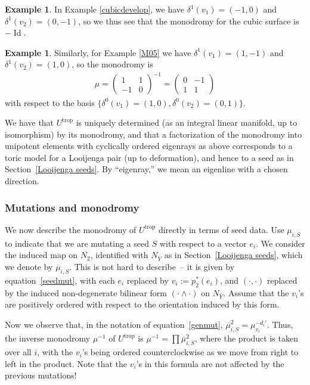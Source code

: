 \documentclass[pdftex]{sigma}
\numberwithin{equation}{section}
\numberwithin{figure}{section}
\numberwithin{table}{section}
\DeclareMathOperator{\id}{Id}
\DeclareMathOperator{\trop}{trop}
\let\?=\overline
\theoremstyle{definition}
\newtheorem{eg}[thm]{Example}
\begin{document}
\begin{eg}In Example \ref{cubicdevelop}, we have $\delta^1(v_1) = (-1,0)$ and $\delta^1(v_2) = (0,-1)$, so we thus see that the monodromy for the cubic surface is $-\id$.
\end{eg}

\begin{eg} \label{M05 mono}Similarly, for Example \ref{M05} we have $\delta^1(v_1) = (1,-1)$ and $\delta^1(v_2) = (1,0)$, so the monodromy is
\begin{gather*}
	\mu= \left(\begin{matrix}
		1 &1 \\
		-1 &0
		\end{matrix}\right)^{-1} =
		\left(\begin{matrix}
		0 &-1 \\
		1 &1
		\end{matrix}\right)
\end{gather*}
with respect to the basis $\big\{ \delta^0(v_1) = (1,0) , \delta^0(v_2) = (0,1) \big\}$.
\end{eg}

We have that $U^{\trop}$ is uniquely determined (as an integral linear manifold, up to isomorphism)
 by its monodromy, and that a factorization of the monodromy into unipotent elements with cyclically ordered eigenrays as above corresponds to a toric model for a Looijenga pair (up to deformation), and hence to a seed as in Section~\ref{Looijenga seeds}. By ``eigenray,'' we mean an eigenline with a chosen direction.

\subsubsection{Mutations and monodromy}\label{mutmono}

We now describe the monodromy of $U^{\trop}$ directly in terms of seed data. Use $\mu_{i,S}$ to indicate that we are mutating a seed $S$ with respect to a vector $e_i$. We consider the induced map on $\?{N_2}$, identified with $N_{\?{Y}}$ as in Section~\ref{Looijenga seeds}, which we denote by $\?{\mu}_{i,S}$. This is not hard to describe~-- it is given by equation~\eqref{seedmut}, with each $e_i$ replaced by $v_i:=p_2^*(e_i)$, and $(\cdot,\cdot)$ replaced by the induced non-degenerate bilinear form $(\cdot\wedge\cdot)$ on $N_{\?{Y}}$.
 Assume that the $v_i$'s are positively ordered with respect to the orientation induced by this form.

Now we observe that, in the notation of equation~\eqref{genmut}, $\?{\mu}_{i,S}^2=\mu_{v_i}^{-d_i'}$. Thus, the inverse monodromy $\mu^{-1}$ of $U^{\trop}$ is $\mu^{-1}= \prod \?{\mu}_{i,S}^2$, where the product is taken over all $i$, with the $v_i$'s being ordered counterclockwise as we move from right to left in the product. Note that the $v_i$'s in this formula are not affected by the previous mutations!
\end{document}
